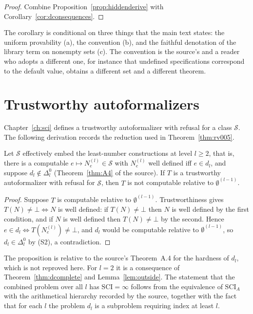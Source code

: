 \begin{proof}
Combine Proposition~\ref{prop:hiddenderive} with Corollary~\ref{cor:dconsequences}.
\end{proof}

The corollary is conditional on three things that the main text states: the uniform provability (a), the convention (b), and the faithful denotation of the library term on nonempty sets (c). The convention is the source's and a reader who adopts a different one, for instance that undefined specifications correspond to the default value, obtains a different set and a different theorem.

\section{Trustworthy autoformalizers}

Chapter~\ref{ch:sci} defines a trustworthy autoformalizer with refusal for a class $\mathcal{S}$. The following derivation records the reduction used in Theorem~\ref{thm:rv005}.

\begin{proposition}
\label{prop:rv005derive}
Let $\mathcal{S}$ effectively embed the least-number constructions at level $l\ge2$, that is, there is a computable $e\mapsto N^{(l)}_e\in\mathcal{S}$ with $N^{(l)}_e$ well defined iff $e\in d_l$, and suppose $d_l\notin\Delta^0_l$ (Theorem~\ref{thm:A4} of the source). If $T$ is a trustworthy autoformalizer with refusal for $\mathcal{S}$, then $T$ is not computable relative to $\emptyset^{(l-1)}$.
\end{proposition}

\begin{proof}
Suppose $T$ is computable relative to $\emptyset^{(l-1)}$. Trustworthiness gives $T(N)\neq\bot\iff N$ is well defined: if $T(N)\neq\bot$ then $N$ is well defined by the first condition, and if $N$ is well defined then $T(N)\ne\bot$ by the second. Hence $e\in d_l\iff T(N^{(l)}_e)\ne\bot$, and $d_l$ would be computable relative to $\emptyset^{(l-1)}$, so $d_l\in\Delta^0_l$ by (S2), a contradiction.
\end{proof}

The proposition is relative to the source's Theorem~A.4 for the hardness of $d_l$, which is not reproved here. For $l=2$ it is a consequence of Theorem~\ref{thm:dcomplete} and Lemma~\ref{lem:outside}. The statement that the combined problem over all $l$ has $\mathrm{SCI}=\infty$ follows from the equivalence of $\mathrm{SCI}_A$ with the arithmetical hierarchy recorded by the source, together with the fact that for each $l$ the problem $d_l$ is a subproblem requiring index at least $l$.

